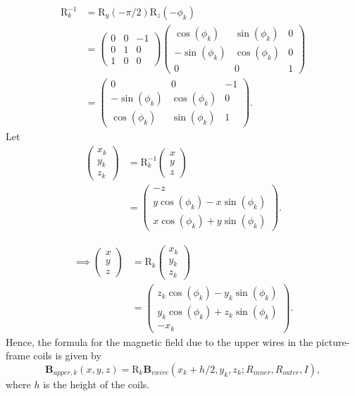 \documentclass{article}
\begin{document}
\[\begin{aligned}
    \text{R}^{-1}_k &= \text{R}_y(-\pi/2)\text{R}_z(-\phi_k) \\
    &= \begin{pmatrix}
        0 & 0 & -1 \\
        0 & 1 & 0 \\
        1 & 0 & 0
    \end{pmatrix}
    \begin{pmatrix}
        \cos(\phi_k) & \sin(\phi_k) & 0 \\
        -\sin(\phi_k) & \cos(\phi_k) & 0 \\
        0 & 0 & 1
    \end{pmatrix} \\
    &= \begin{pmatrix}
        0 & 0 & -1 \\
        -\sin(\phi_k) & \cos(\phi_k) & 0 \\
        \cos(\phi_k) & \sin(\phi_k) & 1
    \end{pmatrix}.
\end{aligned}\]
Let 
\[\begin{aligned}
    \begin{pmatrix}
        x_k \\ y_k \\ z_k
    \end{pmatrix} &= \text{R}^{-1}_k
    \begin{pmatrix}
        x \\ y \\ z
    \end{pmatrix} \\
    &= \begin{pmatrix}
        -z \\
        y \cos(\phi_k) - x \sin(\phi_k) \\
        x \cos(\phi_k) + y \sin(\phi_k)
    \end{pmatrix}.
\end{aligned}\]

\[\begin{aligned}
\implies
\begin{pmatrix}
    x \\ y \\ z
\end{pmatrix} &= 
\text{R}_k
\begin{pmatrix}
    x_k \\ y_k \\ z_k
\end{pmatrix} \\
&= \begin{pmatrix}
    z_k\cos(\phi_k)-y_k\sin(\phi_k)  \\
    y_k\cos(\phi_k) +z_k\sin(\phi_k) \\
    -x_k
\end{pmatrix}.
\end{aligned}\]
Hence, the formula for the magnetic field due to the upper wires in the 
 picture-frame coils is given by
\[\mathbf{B}_{upper,k}(x,y,z) = \text{R}_k\mathbf{B}_{vwire}(x_k + h/2, y_k, z_k; R_{inner}, R_{outer}, I),\]
where $h$ is the height of the coils.
\end{document}
